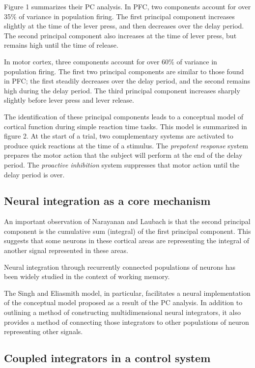\documentclass[12pt]{article}
\begin{document}
Figure 1 summarizes their PC analysis.
In PFC, two components account for over 35\%
of variance in population firing.
The first principal component increases slightly
at the time of the lever press,
and then decreases over the delay period.
The second principal component
also increases at the time of lever press,
but remains high until the time of release.

In motor cortex, three components account
for over 60\% of variance in population firing.
The first two principal components are
similar to those found in PFC;
the first steadily decreases over the delay period,
and the second remains high during the delay period.
The third principal component increases
sharply slightly before lever press
and lever release.

The identification of these principal components
leads to a conceptual model of cortical function
during simple reaction time tasks.
This model is summarized in figure 2. %
At the start of a trial,
two complementary systems are activated
to produce quick reactions at the time of a stimulus.
The \textit{prepotent response} system
prepares the motor action that the subject will perform
at the end of the delay period.
The \textit{proactive inhibition} system
suppresses that motor action until the delay period
is over.

\subsection{Neural integration as a core mechanism}

An important observation of Narayanan and Laubach
is that the second principal component
is the cumulative sum (integral)
of the first principal component.
This suggests that some neurons in these cortical areas
are representing the integral of another
signal represented in these areas.

Neural integration through recurrently connected
populations of neurons has been widely studied
in the context of working memory.

The Singh and Eliasmith model, in particular,
facilitates a neural implementation of the conceptual model
proposed as a result of the PC analysis.
In addition to outlining a method of constructing
multidimensional neural integrators,
it also provides a method of connecting those integrators
to other populations of neuron representing other signals.

\subsection{Coupled integrators in a control system}
\end{document}
